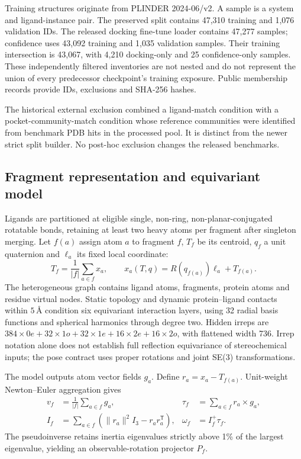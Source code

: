 Training structures originate from PLINDER 2024-06/v2. A sample is a system
and ligand-instance pair. The preserved split contains 47,310 training and
1,076 validation IDs. The released docking fine-tune loader contains 47,277
samples; confidence uses 43,092 training and 1,035 validation samples. Their
training intersection is 43,067, with 4,210 docking-only and 25 confidence-only
samples. These independently filtered inventories are not nested and do not
represent the union of every predecessor checkpoint's training exposure.
Public membership records provide IDs, exclusions and SHA-256 hashes.

The historical external exclusion combined a ligand-match condition with a
pocket-community-match condition whose reference communities were identified
from benchmark PDB hits in the processed pool. It is distinct from the newer
strict split builder. No post-hoc exclusion changes the released benchmarks.

\subsection{Fragment representation and equivariant model}
Ligands are partitioned at eligible single, non-ring, non-planar-conjugated
rotatable bonds, retaining at least two heavy atoms per fragment after
singleton merging. Let $f(a)$ assign atom $a$ to fragment $f$, $T_f$ be its
centroid, $q_f$ a unit quaternion and $\ell_a$ its fixed local coordinate:
\begin{equation}
 T_f=\frac{1}{|f|}\sum_{a\in f}x_a,\qquad
 x_a(T,q)=R(q_{f(a)})\ell_a+T_{f(a)}.
 \label{eq:effdock-reconstruction}
\end{equation}
The heterogeneous graph contains ligand atoms, fragments, protein atoms and
residue virtual nodes. Static topology and dynamic protein--ligand contacts
within $5\,\text{\AA}$ condition six equivariant interaction layers, using
32 radial basis functions and spherical harmonics through degree two. Hidden
irreps are $384\times0e+32\times1o+32\times1e+16\times2e+16\times2o$,
with flattened width 736. Irrep notation alone does not establish full
reflection equivariance of stereochemical inputs; the pose contract uses
proper rotations and joint SE(3) transformations.

The model outputs atom vector fields $g_a$. Define $r_a=x_a-T_{f(a)}$.
Unit-weight Newton--Euler aggregation gives
\begin{align}
 v_f&=\frac{1}{|f|}\sum_{a\in f}g_a,&
 \tau_f&=\sum_{a\in f}r_a\times g_a,\\
 I_f&=\sum_{a\in f}(\|r_a\|^2I_3-r_ar_a^{\mathsf T}),&
 \omega_f&=I_f^+\tau_f.
 \label{eq:effdock-head}
\end{align}
The pseudoinverse retains inertia eigenvalues strictly above 1\% of the
largest eigenvalue, yielding an observable-rotation projector $P_f$.

